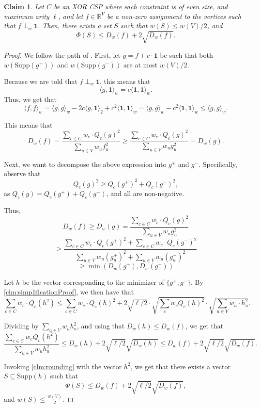 \documentclass[11pt]{article}
\newtheorem{claim}[theorem]{Claim}
\theoremstyle{definition}
\newcommand{\R}{\mathbb{R}}
\newcommand{\Supp}{\mathrm{Supp}}
\begin{document}
\begin{claim}\label{clm:upperBound}
    Let $C$ be an XOR CSP where each constraint is of even size, and maximum arity $\ell$, and let $f \in \R^V$ be a non-zero assignment to the vertices such that $f \perp_w \mathbf{1}$. Then, there exists a set $S$ such that $w(S) \leq w(V) / 2$, and 
    \[
    \Phi(S) \leq D_w(f) + 2 \sqrt{D_w(f)}.
    \]
\end{claim}

\begin{proof}
    We follow the path of \cite{CLTZ18}. First, let $g = f + c \cdot \mathbf{1}$ be such that both $w(\Supp(g^+))$ and $w(\Supp(g^-))$ are at most $w(V) /2$.

    Because we are told that $f \perp_w \mathbf{1}$, this means that 
    \[
    \langle g, \mathbf{1} \rangle_w =  c \langle \mathbf{1}, \mathbf{1} \rangle_w .
    \]
    Thus, we get that 
    \[
    \langle f, f \rangle_w = \langle g, g \rangle_w - 2c \langle g, \mathbf{1} \rangle_2 + c^2 \langle \mathbf{1}, \mathbf{1} \rangle_w =  \langle g, g \rangle_w - c^2 \langle \mathbf{1}, \mathbf{1} \rangle_w \leq \langle g, g \rangle_w.
    \]

    This means that 
    \[
    D_w(f) = \frac{\sum_{c \in C} w_c \cdot Q_c(g)^2}{\sum_{u \in V} w_u f_u^2} \geq \frac{\sum_{c \in C} w_c \cdot Q_c(g)^2}{\sum_{u \in V} w_u g_u^2} = D_w(g).
    \]

    Next, we want to decompose the above expression into $g^+$ and $g^-$. Specifically, observe that 
    \[
    Q_c(g)^2 \geq Q_c(g^{+})^2+ Q_c(g^{-})^2,
    \]
    as $Q_c(g) =Q_c(g^{+}) + Q_c(g^{-})$, and all are non-negative.

    Thus, 
    \[
    D_w(f) \geq D_w(g) = \frac{\sum_{c \in C} w_c \cdot Q_c(g)^2}{\sum_{u \in V} w_u g_u^2}
    \]
    \[
    \geq \frac{\sum_{c \in C} w_c \cdot Q_c(g^+)^2 + \sum_{c \in C} w_c \cdot Q_c(g^-)^2}{\sum_{u \in V} w_u (g_u^+)^2 + \sum_{u \in V} w_u (g_u^-)^2}
    \]
    \[
    \geq \min(D_w(g^+), D_w(g^-))
    \]

    Let $h$ be the vector corresponding to the minimizer of $\{g^+, g^-\}$. By \cref{clm:simplificationProof}, we then have that
    \[
    \sum_{c \in C} w_c \cdot Q_c(h^2) \leq \sum_{c \in C}  w_c \cdot Q_c(h)^2 + 2 \sqrt{\ell/2} \cdot \sqrt{\sum_c w_c Q_c(h)^2} \cdot \sqrt{\sum_{u \in V} w_u \cdot h_u^2}.
    \]

Dividing by $\sum_{u \in V} w_u h_u^2$, and using that $D_w(h) \leq D_w(f)$, we get that
\[
\frac{\sum_{c \in C} w_c Q_c(h^2)}{\sum_{u \in V} w_u h_u^2} \leq D_w(h) + 2\sqrt{\ell/2} \sqrt{D_w(h)} \leq D_w(f) + 2\sqrt{\ell/2} \sqrt{D_w(f)}.
\]

Invoking \cref{clm:rounding} with the vector $h^2$, we get that there exists a vector $S \subseteq \Supp(h)$ such that 
\[
\Phi(S) \leq D_w(f) + 2\sqrt{\ell/2} \sqrt{D_w(f)},
\]
and $w(S) \leq \frac{w(V)}{2}$.
\end{proof}
\end{document}
